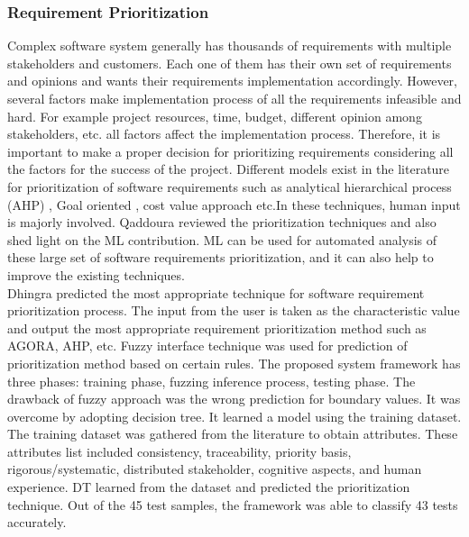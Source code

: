 \subsubsection{Requirement Prioritization}
Complex software system generally has thousands of requirements with multiple
stakeholders and customers. Each one of them has their own set of requirements
and opinions and wants their requirements implementation accordingly. However,
several factors make implementation process of all the requirements infeasible
and hard. For example project resources, time, budget, different opinion among
stakeholders, etc. all factors affect the implementation process. Therefore, it
is important to make a proper decision for prioritizing requirements considering
all the factors for the success of the project. Different models exist in the
literature for prioritization of software requirements such as analytical
hierarchical process (AHP) \cite{saaty2008}, Goal oriented
\cite{VanLamsweerde:2001}, cost value approach \cite{Karlsson:1997} etc.In these
techniques, human input is majorly involved. Qaddoura \etal \cite{RQaddoura}
reviewed the prioritization techniques and also shed light on the ML
contribution. ML can be used for automated analysis of these large set of
software requirements prioritization, and it can also help to improve the existing techniques.\\

	Dhingra \etal  \cite{S.Dhingra} predicted the most appropriate technique for
software requirement prioritization process. The input from the user is taken as
the characteristic value and output the
most appropriate requirement prioritization method such as AGORA, AHP, etc. Fuzzy interface technique was
used for prediction of prioritization method based on certain rules. The
proposed system framework has three phases: training phase, fuzzing inference
process, testing phase. The drawback of fuzzy approach was the wrong prediction
for boundary values. It was overcome by adopting decision tree. It learned a
model using the training dataset. The training dataset was gathered from the
literature to obtain attributes. These attributes list included consistency,
traceability, priority basis, rigorous/systematic, distributed stakeholder,
cognitive aspects, and human experience. DT learned from the dataset and
predicted the prioritization technique. Out of the 45 test samples, the
framework was able to classify 43 tests accurately.\\

